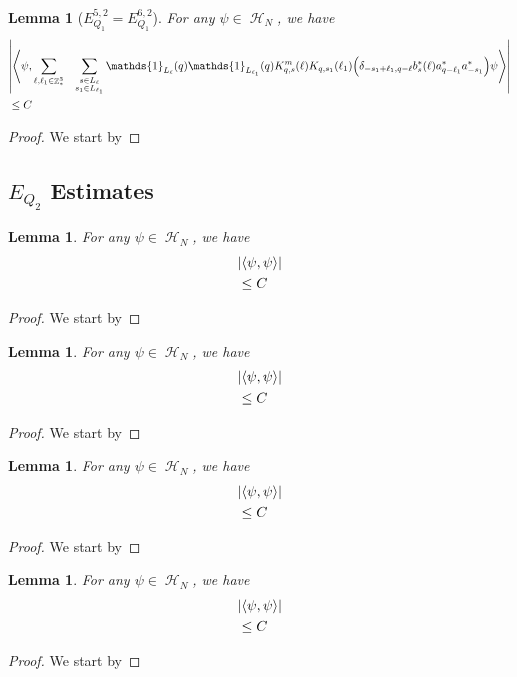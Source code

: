 \documentclass[sn-mathphys, Numbered ,a4paper]{sn-jnl}%
\DeclareMathOperator{\Z}{\mathbb{Z}}
\DeclareMathOperator{\HH}{\mathcal{H}}
\newcommand{\eva}[1]{\left\langle #1 \right\rangle}
\theoremstyle{plain}
\newtheorem{lemma}[theorem]{Lemma}
\theoremstyle{definition}
\theoremstyle{remark}
\theoremstyle{plain}
\theoremstyle{definition}
\theoremstyle{remark}
\begin{document}
\begin{lemma}[$E_{Q_1}^{5,2}=E_{Q_1}^{6,2}$]
	For any $\psi \in \HH_N$, we have
	\begin{align}
		&\abs{\eva{\psi,\sum\limits_{\ell, \ell_1\in \Z^3_*} \!\quad \sum\limits_{ \substack{s \in L_{\ell} \\ s_1\in L_{\ell_1}}} \mathds{1}_{L_\ell}(q) \mathds{1}_{L_{\ell_1}}(q) K^{m}_{q,s}(\ell) K_{q,s_1}(\ell_1) \Big(\delta_{-s_1+\ell_1,q-\ell} b^*_{s}(\ell) a^*_{q-\ell_1} a^*_{-s_1} \Big) \psi}}\nonumber\\
		&\leq C
	\end{align}
\end{lemma}
\begin{proof}
	We start by
\end{proof}

\subsection{$E_{Q_2}$ Estimates}
\begin{lemma}
    For any $\psi \in \HH_N$, we have
    \begin{align}
        &\abs{\eva{\psi,   \psi}}\nonumber\\&\leq C
    \end{align}
\end{lemma}
\begin{proof}
    We start by
\end{proof}

\begin{lemma}
    For any $\psi \in \HH_N$, we have
    \begin{align}
        &\abs{\eva{\psi,   \psi}}\nonumber\\&\leq C
    \end{align}
\end{lemma}
\begin{proof}
    We start by
\end{proof}

\begin{lemma}
    For any $\psi \in \HH_N$, we have
    \begin{align}
        &\abs{\eva{\psi,   \psi}}\nonumber\\&\leq C
    \end{align}
\end{lemma}
\begin{proof}
    We start by
\end{proof}

\begin{lemma}
    For any $\psi \in \HH_N$, we have
    \begin{align}
        &\abs{\eva{\psi,   \psi}}\nonumber\\&\leq C
    \end{align}
\end{lemma}
\begin{proof}
    We start by
\end{proof}
\end{document}
